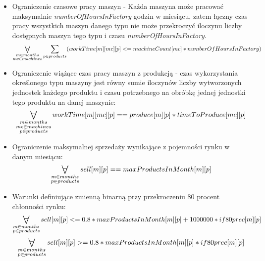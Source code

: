 \documentclass[11pt,a4paper]{article}
\newcommand\bigforall{%
  \mathop{\lower0.75ex\hbox{\ensuremath{%
    \mathlarger{\mathlarger{\mathlarger{\mathlarger{\forall}}}}}}}%
  \limits}
\begin{document}
\begin{itemize}
\item Ograniczenie czasowe pracy maszyn - Każda maszyna może pracować maksymalnie \textit{numberOfHoursInFactory} godzin w miesiącu, zatem łączny czas pracy wszystkich maszyn danego typu nie może przekroczyć iloczynu liczby dostępnych maszyn tego typu i czasu \textit{numberOfHoursInFactory}.
	\begin{equation}
		\bigforall_{\substack{
			m \in months\\ 
			mc \in machines}}  \sum_{p \in products}
		(workTime[m][mc][p] <= machineCount[mc]*numberOfHoursInFactory)
	\end{equation}
    \item Ograniczenie wiążące czas pracy maszyn z produkcją - czas wykorzystania określonego typu maszyny jest równy sumie iloczynów liczby wytworzonych jednostek każdego produktu i czasu potrzebnego na obróbkę jednej jednostki tego produktu na danej maszynie:
	\begin{equation}
		\bigforall_{\substack{
			m \in months\\ 
			mc \in machines\\
			p \in products}} workTime[m][mc][p] == produce[m][p]*timeToProduce[mc][p]
	\end{equation}
    \item Ograniczenie maksymalnej sprzedaży wynikające z pojemności rynku w danym miesiącu:
	\begin{equation}
		\bigforall_{\substack{
			m \in months\\ 
			p \in products}} sell[m][p] == maxProductsInMonth[m][p]
	\end{equation}
	
    \item Warunki definiujące zmienną binarną przy przekroczeniu 80 procent chłonności rynku:
	\begin{equation}
		\bigforall_{\substack{
			m \in months\\ 
			p \in products}}  sell[m][p] <= 0.8*maxProductsInMonth[m][p] + 1000000 * if80prec[m][p]
	\end{equation}
	\begin{equation}
		\bigforall_{\substack{
			m \in months\\ 
			p \in products}} sell[m][p] >= 0.8*maxProductsInMonth[m][p] * if80prec[m][p]
	\end{equation}
	

\end{itemize}
\end{document}
